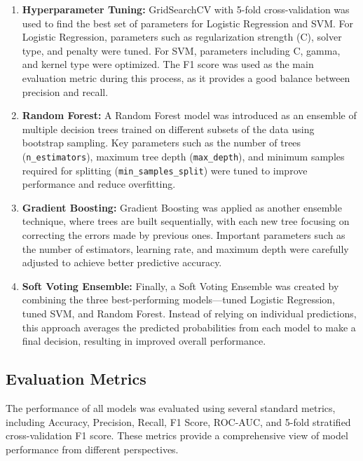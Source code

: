 \documentclass[conference]{IEEEtran}
\begin{document}
\begin{enumerate}
\item \textbf{Hyperparameter Tuning:} GridSearchCV with 5-fold cross-validation was used to find the best set of parameters for Logistic Regression and SVM. For Logistic Regression, parameters such as regularization strength (C), solver type, and penalty were tuned. For SVM, parameters including C, gamma, and kernel type were optimized. The F1 score was used as the main evaluation metric during this process, as it provides a good balance between precision and recall.

\item \textbf{Random Forest:} A Random Forest model was introduced as an ensemble of multiple decision trees trained on different subsets of the data using bootstrap sampling. Key parameters such as the number of trees (\texttt{n\_estimators}), maximum tree depth (\texttt{max\_depth}), and minimum samples required for splitting (\texttt{min\_samples\_split}) were tuned to improve performance and reduce overfitting.

\item \textbf{Gradient Boosting:} Gradient Boosting was applied as another ensemble technique, where trees are built sequentially, with each new tree focusing on correcting the errors made by previous ones. Important parameters such as the number of estimators, learning rate, and maximum depth were carefully adjusted to achieve better predictive accuracy.

\item \textbf{Soft Voting Ensemble:} Finally, a Soft Voting Ensemble was created by combining the three best-performing models—tuned Logistic Regression, tuned SVM, and Random Forest. Instead of relying on individual predictions, this approach averages the predicted probabilities from each model to make a final decision, resulting in improved overall performance.
\end{enumerate}

\subsection{Evaluation Metrics}

The performance of all models was evaluated using several standard metrics, including Accuracy, Precision, Recall, F1 Score, ROC-AUC, and 5-fold stratified cross-validation F1 score. These metrics provide a comprehensive view of model performance from different perspectives.
\end{document}
